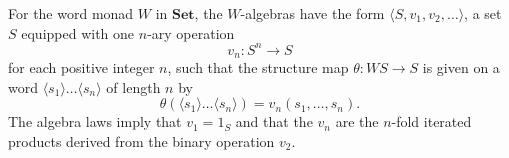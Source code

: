 For the word monad $W$ in $\mathbf{Set}$, the $W$-algebras have the form $\langle S, v_1, v_2, \dots \rangle$, a set $S$ equipped with one $n$-ary operation
$$v_n : S^n \to S$$
for each positive integer $n$, such that the structure map $\theta : WS \to S$ is given on a word $\langle s_1 \rangle \dots \langle s_n \rangle$ of length $n$ by
$$\theta(\langle s_1 \rangle \dots \langle s_n \rangle) = v_n(s_1, \dots, s_n).$$
The algebra laws imply that $v_1 = 1_S$ and that the $v_n$ are the $n$-fold iterated products derived from the binary operation $v_2$.
